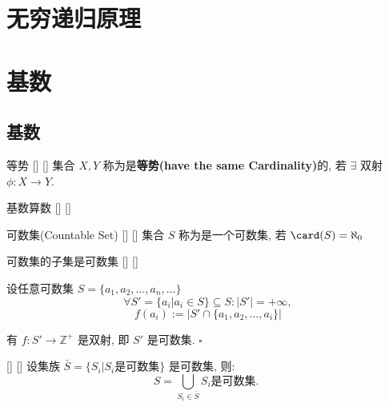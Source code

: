 \documentclass[UTF8]{ctexart}
\begin{document}
\section{无穷递归原理}

\section{基数}  

    \subsection{基数}
    
        \begin{dfn}
            []
            {等势}
            []
            []
            集合 \(X,Y\) 称为是\textbf{等势(have the same Cardinality)}的, 若 \(\exists\) 双射 \(\phi:X\to Y\). 
        \end{dfn}
        
        \begin{thm}
            []
            {基数算数}
            []
            []
        \end{thm}
                
            \begin{dfn}
                []
                {可数集(Countable Set)}
                []
                []
                集合 \(S\) 称为是一个可数集, 若 \(\card(S)=\aleph_0\) 
            \end{dfn}
                
            \begin{ppt}
                []
                {可数集的子集是可数集}
                []
                []
            \end{ppt}    
                
            \begin{prf}
                设任意可数集 \(S=\{a_1,a_2,\dots,a_n,\dots\}\) 
                \[\forall S'=\{a_i|a_i\in S\}\subseteq S: |S'|=+\infty, \]
                \[f(a_i):=|S'\cap\{a_1,a_2,\dots,a_i\}|\]
                
                有 \(f:S'\to\mathbb{Z}^+\) 是双射, 即 \(S'\) 是可数集.  \(\square\) 
            \end{prf}

            \begin{thm}
                []
                {}
                []
                []
                设集族 \(\bar S=\{S_i|S_i\mbox{是可数集}\}\) 是可数集, 则: 
                \[S=\bigcup_{S_i\in \bar S}S_i\mbox{是可数集. }\]
            \end{thm}
                
\end{document}
